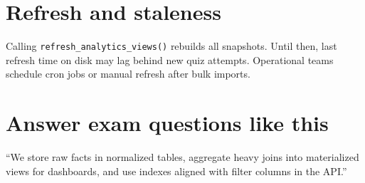 \section{Refresh and staleness}
Calling \texttt{refresh\_analytics\_views()} rebuilds all snapshots. Until then, last refresh time on disk may lag behind new quiz attempts. Operational teams schedule cron jobs or manual refresh after bulk imports.

\section{Answer exam questions like this}
``We store raw facts in normalized tables, aggregate heavy joins into materialized views for dashboards, and use indexes aligned with filter columns in the API.''

